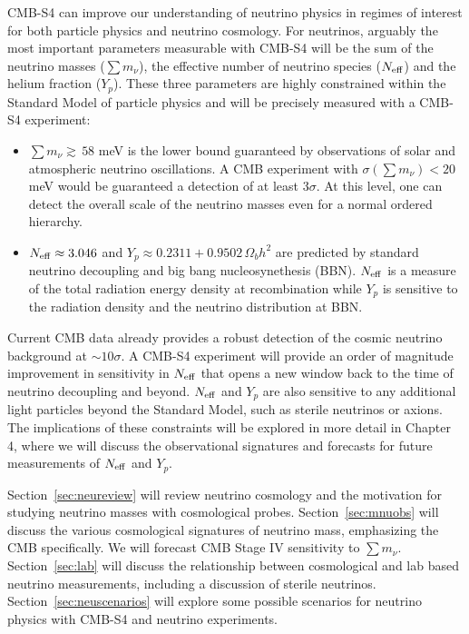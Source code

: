 CMB-S4 can improve our understanding of neutrino physics in regimes of interest for both particle physics and neutrino cosmology.  For neutrinos, arguably the most important parameters measurable with CMB-S4 will be the sum of the neutrino masses ($\sum m_\nu$), the effective number of neutrino species ($N_{\rm eff}$) and the helium fraction ($Y_p$).  These three parameters are highly constrained within the Standard Model of particle physics and will be precisely measured with a CMB-S4 experiment:
\begin{itemize}
\item $ \sum m_\nu \gtrsim \, 58$ meV is the lower bound guaranteed by observations of solar and atmospheric neutrino oscillations.  A CMB experiment with $\sigma(\sum m_\nu) < 20$ meV would be guaranteed a detection of at least 3$\sigma$.  At this level, one can detect the overall scale of the neutrino masses even for a normal ordered hierarchy.
\item $N_{\rm eff} \approx  3.046$ and $Y_p \approx 0.2311 + 0.9502 \, \Omega_b h^2$ are predicted by standard neutrino decoupling and big bang nucleosynethesis (BBN).  $N_{\rm eff}$ is a measure of the total radiation energy density at recombination while $Y_p$ is sensitive to the radiation density and the neutrino distribution at BBN. 
\end{itemize}
Current CMB data already provides a robust detection of the cosmic neutrino background at $\sim10 \sigma$.  A CMB-S4 experiment will provide an order of magnitude improvement in sensitivity in $N_{\rm eff}$ that opens a new window back to the time of neutrino decoupling and beyond.  $N_{\rm eff}$ and $Y_p$ are also sensitive to any additional light particles beyond the Standard Model, such as sterile neutrinos or axions.  The implications of these constraints will be explored in more detail in Chapter 4, where we will discuss the observational signatures and forecasts for future measurements of $N_{\rm eff}$ and $Y_p$.  

Section~\ref{sec:neureview} will review neutrino cosmology and the motivation for studying neutrino masses with cosmological probes.  Section~\ref{sec:mnuobs} will discuss the various cosmological signatures of neutrino mass, emphasizing the CMB specifically.  We will forecast CMB Stage IV sensitivity to $\sum m_\nu$.  Section~\ref{sec:lab} will discuss the relationship between cosmological and lab based neutrino measurements, including a discussion of sterile neutrinos.  Section~\ref{sec:neuscenarios} will explore some possible scenarios for neutrino physics with CMB-S4 and neutrino experiments.

